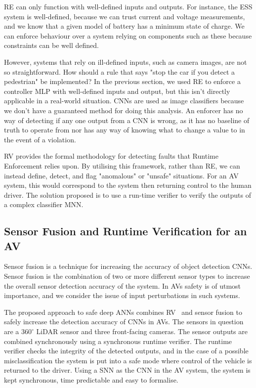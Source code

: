 \ac{RE} can only function with well-defined inputs and outputs.
For instance, the \ac{ESS} system is well-defined, because we can trust current and voltage measurements, and we know that a given model of battery has a minimum state of charge.
We can enforce behaviour over a system relying on components such as these because constraints can be well defined.

However, systems that rely on ill-defined inputs, such as camera images, are not so straightforward.
How should a rule that says "stop the car if you detect a pedestrian" be implemented?
In the previous section, we used \ac{RE} to enforce a controller \ac{MLP} with well-defined inputs and output, but this isn't directly applicable in a real-world situation.
\acp{CNN} are used as image classifiers because we don't have a guaranteed method for doing this analysis.
An enforcer has no way of detecting if any one output from a \ac{CNN} is wrong, as it has no baseline of truth to operate from nor has any way of knowing what to change a value to in the event of a violation.

\acf{RV} provides the formal methodology for detecting faults that Runtime Enforcement relies upon.
By utilising this framework, rather than \ac{RE}, we can instead define, detect, and flag "anomalous" or "unsafe" situations.
For an \ac{AV} system, this would correspond to the system then returning control to the human driver.
The solution proposed is to use a run-time verifier to verify the outputs of a complex classifier \ac{MNN}.

\subsection{Sensor Fusion and Runtime Verification for an \acf{AV}~\cite{SensorFusion2017}}
Sensor fusion is a technique for increasing the accuracy of object detection \acp{CNN}. 
Sensor fusion is the combination of two or more different sensor types to increase the overall sensor detection accuracy of the system.
In \acfp{AV} safety is of utmost importance, and we consider the issue of input perturbations in such systems.

The proposed approach to safe deep \acp{ANN} combines \acf{RV}~\cite{runtime-verify} and sensor fusion to safely increase the detection accuracy of \acp{CNN} in \acp{AV}.
The sensors in question are a $360^\circ$ \ac{LiDAR} sensor and three front-facing cameras.
The sensor outputs are combined synchronously using a synchronous runtime verifier.
The runtime verifier checks the integrity of the detected outputs, and in the case of a possible misclassification the system is put into a safe mode where control of the vehicle is returned to the driver.
Using a \acf{SNN} as the \ac{CNN} in the \ac{AV} system, the system is kept synchronous, time predictable and easy to formalise.

